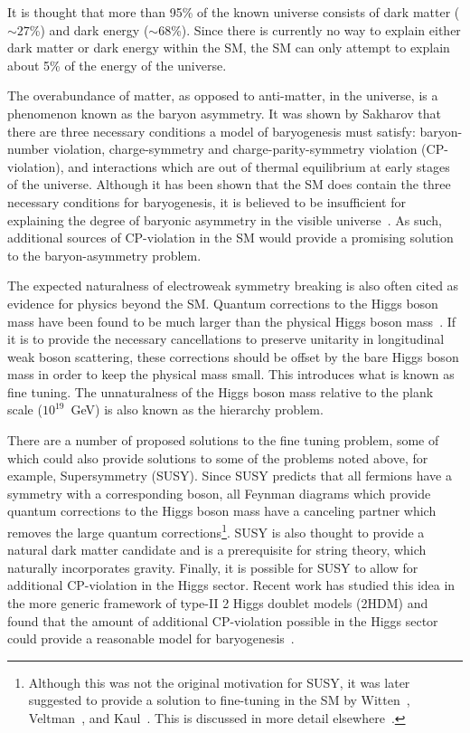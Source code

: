 It is thought that more than 95\% of the known universe consists 
of dark matter ($\sim27$\%) and dark energy
($\sim68$\%)\cite{Sullivan:2011kv}.
Since there is currently no way to explain either dark matter or 
dark energy within the SM, the SM can only attempt to explain
about 5\% of the energy of the universe.

The overabundance of matter, as opposed to anti-matter, in the 
universe, is a phenomenon known as the baryon asymmetry.
It was shown by Sakharov\cite{Sakharov:1967dj} that there are 
three necessary 
conditions a model of baryogenesis must satisfy: baryon-number 
violation, charge-symmetry and charge-parity-symmetry violation (CP-violation), and interactions 
which are out of thermal equilibrium at early stages of the 
universe.  Although it has been shown that the SM does
contain the three necessary conditions for baryogenesis, it is 
believed to be insufficient for explaining the degree of baryonic 
asymmetry in the visible 
universe~\cite{Jarlskog:1985ht,Shaposhnikov:1986jp}.  As such,
additional sources of CP-violation in the SM would provide a
promising solution to the baryon-asymmetry problem.  

The expected naturalness of electroweak symmetry breaking is
also often cited as evidence for physics beyond the SM.  
Quantum corrections to the Higgs boson mass have been found to be much 
larger than the physical Higgs boson mass~\cite{Aitchison:2007}. 
If it is to provide the 
necessary cancellations to preserve unitarity in longitudinal weak 
boson scattering, these corrections should be offset by the 
bare Higgs boson
mass in order to keep the physical mass small.  This introduces
what is known as fine tuning.  The unnaturalness of the Higgs boson mass
relative to the plank scale ($10^{19}$~GeV) is also known as the
hierarchy problem.

There are a 
number of proposed solutions to the fine tuning problem, some 
of which 
could also provide solutions to some of the problems noted above,
for example, Supersymmetry (SUSY).  
Since SUSY predicts that all fermions have a symmetry with a 
corresponding boson, 
all Feynman diagrams which provide quantum corrections to the Higgs 
boson mass have a canceling partner which removes the large quantum 
corrections\footnote{Although this was not the original motivation
for SUSY, it was later suggested to provide a solution to 
fine-tuning in the SM by Witten~\cite{Witten:1981nf}, 
Veltman~\cite{Veltman:1980mj}, and Kaul~\cite{Kaul:1981wp}.  
This is discussed in more detail elsewhere~\cite{Aitchison:2007}. }.
SUSY is also thought to provide a natural dark matter candidate and
is a prerequisite for string theory, which naturally incorporates 
gravity.  Finally, it is possible 
for SUSY to allow for additional CP-violation in the Higgs sector.
Recent work has studied this idea in the more generic framework of
type-II 2 Higgs doublet models (2HDM) and found that the amount of
additional CP-violation possible in the Higgs sector could provide
a reasonable model for baryogenesis~\cite{Shu:2013uua}.  

